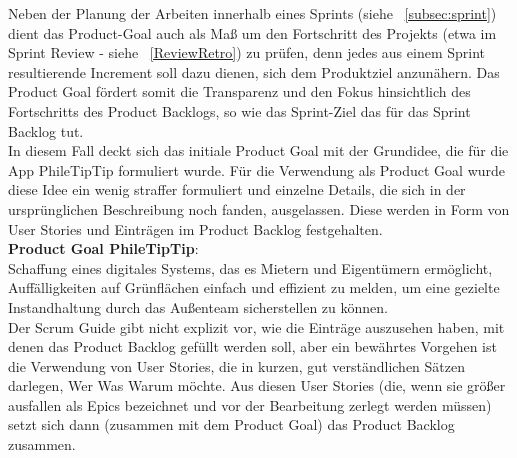 Neben der Planung der Arbeiten innerhalb eines Sprints (siehe ~\ref{subsec:sprint}) dient das Product-Goal auch als Maß um den Fortschritt des Projekts (etwa im Sprint Review -  siehe ~\ref{ReviewRetro}) zu prüfen, denn jedes aus einem Sprint resultierende Increment soll dazu dienen, sich dem Produktziel anzunähern. Das Product Goal fördert somit die Transparenz und den Fokus hinsichtlich des Fortschritts des Product Backlogs, so wie das Sprint-Ziel das für das Sprint Backlog tut.\\

In diesem Fall deckt sich das initiale Product Goal mit der Grundidee, die für die App PhileTipTip formuliert wurde. Für die Verwendung als Product Goal wurde diese Idee ein wenig straffer formuliert und einzelne Details, die sich in der ursprünglichen Beschreibung noch fanden, ausgelassen. Diese werden in Form von User Stories und Einträgen im Product Backlog festgehalten.\\

\textbf{Product Goal PhileTipTip}:\\
Schaffung eines digitales Systems, das es Mietern und Eigentümern ermöglicht, Auffälligkeiten auf Grünflächen einfach und effizient zu melden, um eine gezielte Instandhaltung durch das Außenteam sicherstellen zu können.\\

Der Scrum Guide gibt nicht explizit vor, wie die Einträge auszusehen haben, mit denen das Product Backlog gefüllt werden soll, aber ein bewährtes Vorgehen ist die Verwendung von User Stories, die in kurzen, gut verständlichen Sätzen darlegen, Wer Was Warum möchte. Aus diesen User Stories (die, wenn sie größer ausfallen als Epics bezeichnet und vor der Bearbeitung zerlegt werden müssen) setzt sich dann (zusammen mit dem Product Goal) das Product Backlog zusammen.


